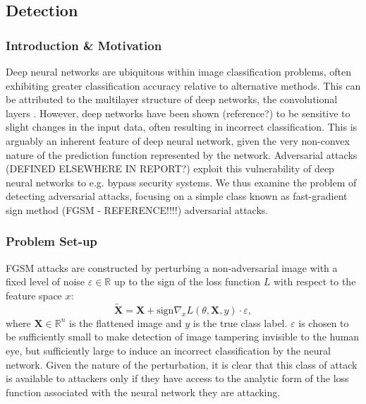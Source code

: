 \subsection{Detection}

\subsubsection{Introduction \& Motivation}


Deep neural networks are ubiquitous within image classification problems, often exhibiting greater classification accuracy relative to alternative methods. This can be attributed to the multilayer structure of deep networks, the convolutional layers . However, deep networks have been shown (reference?) to be sensitive to slight changes in the input data, often resulting in incorrect classification. This is arguably an inherent feature of deep neural network, given the very non-convex nature of the prediction function represented by the network. Adversarial attacks (DEFINED ELSEWHERE IN REPORT?) exploit this vulnerability of deep neural networks to e.g. bypass security systems. We thus examine the problem of detecting adversarial attacks, focusing on a simple class known as  fast-gradient sign method (FGSM - REFERENCE!!!!) adversarial attacks.

\subsubsection{Problem Set-up}\label{Setup}

FGSM attacks are constructed by perturbing a non-adversarial image with a fixed level of noise $\varepsilon \in \mathbb{R}$ up to the sign of the loss function $L$ with respect to the feature space $x$:
\begin{equation}
\mathbf{\tilde{X}}=\mathbf{X} + \text{sign}{\nabla_x L(\theta,\mathbf{X},y)}\cdot\varepsilon,
\end{equation}
where $\mathbf{X} \in \mathbb{R}^n$ is the flattened image and $y$ is the true class label. $\varepsilon$ is chosen to be sufficiently small to make detection of image tampering invisible to the human eye, but sufficiently large to induce an incorrect classification by the neural network. Given the nature of the perturbation, it is clear that this class of attack is available to attackers only if they have access to the analytic form of the loss function associated with the neural network they are attacking. 

